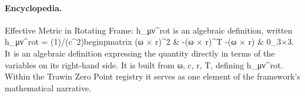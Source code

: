 \paragraph{Encyclopedia.}
Effective Metric in Rotating Frame: h\_μν\textasciicircum{}rot is an algebraic definition, written h\_μν\textasciicircum{}rot = (1)/(c\textasciicircum{}2)beginpmatrix (ω × r)\textasciicircum{}2 \& -(ω × r)\textasciicircum{}T -(ω × r) \& 0\_3×3. It is an algebraic definition expressing the quantity directly in terms of the variables on its right-hand side. It is built from ω, c, r, T, defining h\_μν\textasciicircum{}rot. Within the Trawin Zero Point registry it serves as one element of the framework's mathematical narrative.
